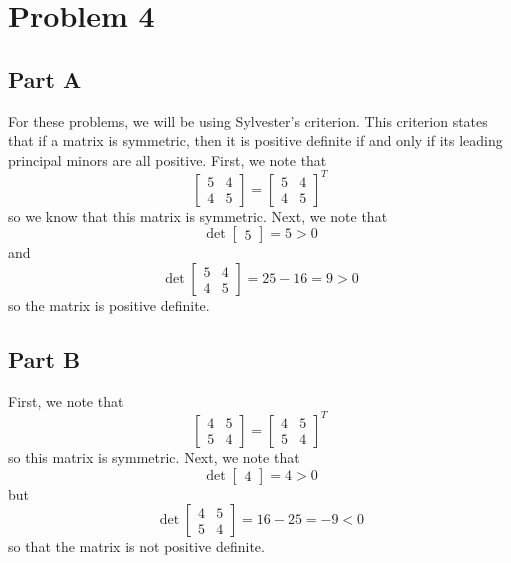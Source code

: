 \documentclass[12pt]{article}
\begin{document}
\section*{Problem 4}
\subsection*{Part A}
For these problems, we will be using Sylvester's criterion. This criterion states that if a matrix is symmetric, then it is positive definite if and only if its leading principal minors are all positive.
First, we note that
\[
\begin{bmatrix}
5 & 4\\
4 & 5
\end{bmatrix}
=
\begin{bmatrix}
5 & 4\\
4 & 5
\end{bmatrix}^T
\] so we know that this matrix is symmetric. Next, we note that
\[
\det \begin{bmatrix}5 \end{bmatrix} = 5 > 0
\] and
\[
\det \begin{bmatrix}
5 & 4\\
4 & 5
\end{bmatrix} = 25 - 16 = 9 > 0
\] so the matrix is positive definite.
\newpage
\subsection*{Part B}
First, we note that
\[
\begin{bmatrix}
4 & 5\\
5 & 4
\end{bmatrix} = 
\begin{bmatrix}
4 & 5\\
5 & 4
\end{bmatrix}^T
\] so this matrix is symmetric. Next, we note that
\[
\det \begin{bmatrix}
4
\end{bmatrix} = 4 > 0
\] but 
\[
\det \begin{bmatrix}
4 & 5\\
5 & 4
\end{bmatrix} = 16 - 25 = -9 < 0
\] so that the matrix is not positive definite.
\newpage
\end{document}
